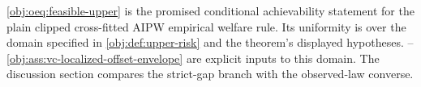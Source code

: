 \cref{obj:oeq:feasible-upper} is the promised conditional achievability statement for the plain clipped cross-fitted AIPW empirical welfare rule.  Its uniformity is over the domain specified in \cref{obj:def:upper-risk} and the theorem's displayed hypotheses.  --\cref{obj:ass:vc-localized-offset-envelope} are explicit inputs to this domain.  The discussion section compares the strict-gap branch with the observed-law converse.
